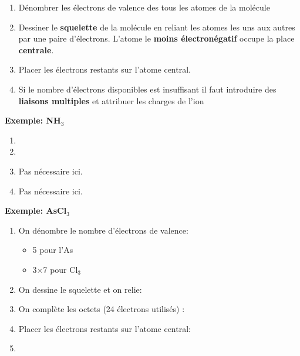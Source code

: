 \documentclass[10pt,a4paper]{book}
\begin{document}
\begin{enumerate}
\item Dénombrer les électrons de valence des tous les atomes de la molécule
\item Dessiner le \textbf{squelette} de la molécule en reliant les atomes les uns aux autres par une paire d'électrons. L'atome le \textbf{moins électronégatif} occupe la place \textbf{centrale}.
\item Placer les électrons restants sur l'atome central.
\item Si le nombre d'électrons disponibles est insuffisant il faut introduire des \textbf{liaisons multiples} et attribuer les charges de l'ion
\end{enumerate}
\textbf{Exemple: NH$_3$}
\begin{center}
\begin{enumerate}
\item {}
\item {}
\item Pas nécessaire ici.
\item Pas nécessaire ici.
\end{enumerate}
\end{center}
\textbf{Exemple: AsCl$_3$}
\begin{enumerate}
\item On dénombre le nombre d'électrons de valence:
\begin{itemize}
	\item 5 pour l'As
	\item 3$\times$7 pour Cl$_3$
\end{itemize}
\item On dessine le squelette et on relie: 
\item On complète les octets (24 électrons utilisés) : 
\item Placer les électrons restants sur l’atome central: 
\item %
\end{enumerate}
\end{document}
